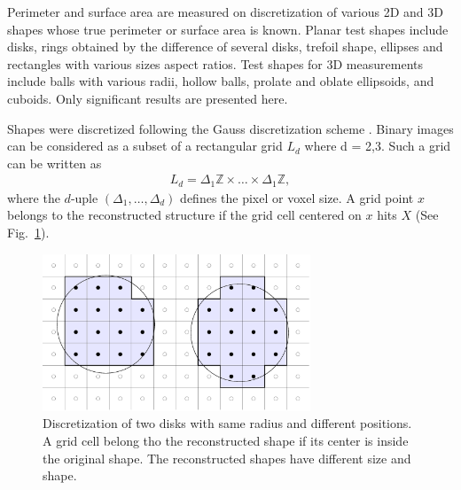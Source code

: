 \documentclass{InsightArticle}
\begin{document}

Perimeter and surface area are measured on discretization of various 2D and 3D shapes 
whose true perimeter or surface area is known. 
Planar test shapes include disks, rings obtained by the difference of several disks,
trefoil shape, ellipses and rectangles with various sizes aspect ratios.
Test shapes for 3D measurements include balls with various radii, hollow balls, 
prolate and oblate ellipsoids, and cuboids. Only significant results are presented here.

Shapes were discretized following the Gauss discretization scheme \cite{Klette2004, Legland2007}.
Binary images can be considered as a subset of a rectangular grid $L_d$ where
d = 2,3. Such a grid can be written as
\begin{eqnarray}
L_d = \Delta_{1} \mathbb{Z} \times \ldots \times \Delta_{1} \mathbb{Z},
\end{eqnarray}
where the $d$-uple $(\Delta_{1},\ldots,\Delta_{d})$ defines the pixel
or voxel size. 
A grid point $x$ belongs to the reconstructed structure if the grid
cell centered on $x$ hits $X$ (See Fig.~\ref{fig:DiskDiscretization}).

\begin{figure}[!htb]
\begin{center}
\includegraphics[width=8cm]{images/discreteDisks2}
\end{center}
\caption{Discretization of two disks with same radius and different positions. 
A grid cell belong tho the reconstructed shape if its center is inside the original shape.
The reconstructed shapes have different size and shape.}
\label{fig:DiskDiscretization}
\end{figure}


\end{document}
